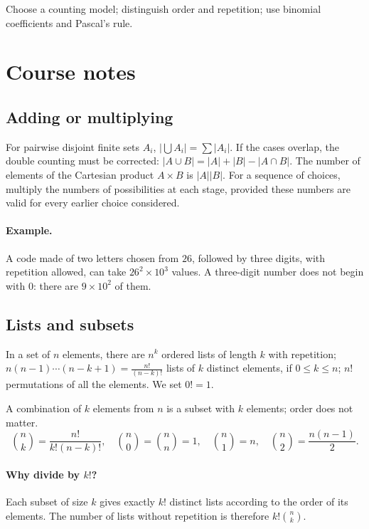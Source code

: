 \label{ch:9}


\begin{keypoint}[Objectives]Choose a counting model; distinguish order and repetition; use binomial coefficients and Pascal's rule.\end{keypoint}

\section{Course notes}
\subsection{Adding or multiplying}
For pairwise disjoint finite sets $A_i$, $|\bigcup A_i|=\sum|A_i|$. If the cases overlap, the double counting must be corrected: $|A\cup B|=|A|+|B|-|A\cap B|$.
The number of elements of the Cartesian product $A\times B$ is $|A||B|$. For a sequence of choices, multiply the numbers of possibilities at each stage, provided these numbers are valid for every earlier choice considered.
\paragraph{Example.} A code made of two letters chosen from $26$, followed by three digits, with repetition allowed, can take $26^2\times10^3$ values. A three-digit number does not begin with $0$: there are $9\times10^2$ of them.
\subsection{Lists and subsets}
In a set of $n$ elements, there are $n^k$ ordered lists of length $k$ with repetition; $n(n-1)\cdots(n-k+1)=\frac{n!}{(n-k)!}$ lists of $k$ distinct elements, if $0\le k\le n$; $n!$ permutations of all the elements. We set $0!=1$.
\begin{keypoint}[Combinations]
A combination of $k$ elements from $n$ is a subset with $k$ elements; order does not matter.
\[\binom nk=\frac{n!}{k!(n-k)!},\quad\binom n0=\binom nn=1,\quad\binom n1=n,\quad\binom n2=\frac{n(n-1)}2.\]
\end{keypoint}
\paragraph{Why divide by $k!$?} Each subset of size $k$ gives exactly $k!$ distinct lists according to the order of its elements. The number of lists without repetition is therefore $k!\binom nk$.
